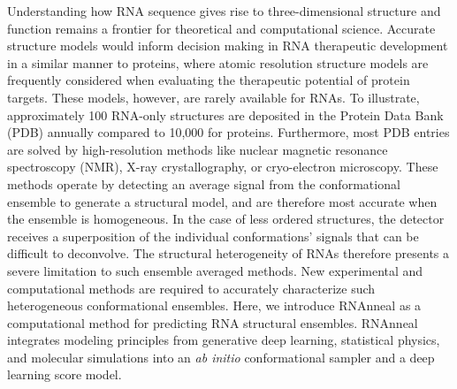 \documentclass[%
aip,
 amsmath,amssymb,
reprint,%
twocolumn,
]{revtex4-1}
\begin{document}
Understanding how RNA sequence gives rise to three-dimensional structure and function remains a frontier for theoretical and computational science. Accurate structure models would inform decision making in RNA therapeutic development in a similar manner to proteins, where atomic resolution structure models are frequently considered when evaluating the therapeutic potential of protein targets. These models, however, are rarely available for RNAs. To illustrate, approximately 100 RNA-only structures are deposited in the Protein Data Bank (PDB) annually compared to 10,000 for proteins.\cite{berman2000protein} Furthermore, most PDB entries are solved by high-resolution methods like nuclear magnetic resonance spectroscopy (NMR), X-ray crystallography, or cryo-electron microscopy. These methods operate by detecting an average signal from the conformational ensemble to generate a structural model, and are therefore most accurate when the ensemble is homogeneous. In the case of less ordered structures, the detector receives a superposition of the individual conformations' signals that can be difficult to deconvolve. The structural heterogeneity of RNAs therefore presents a severe limitation to such ensemble averaged methods. New experimental and computational methods are required to accurately characterize such heterogeneous conformational ensembles.\cite{morandi2021genome,ding2023visualizing,bowman2024alphafold} Here, we introduce RNAnneal as a computational method for predicting RNA structural ensembles. RNAnneal integrates modeling principles from generative deep learning, statistical physics, and molecular simulations into an {\it ab initio }conformational sampler and a deep learning score model.
\end{document}
